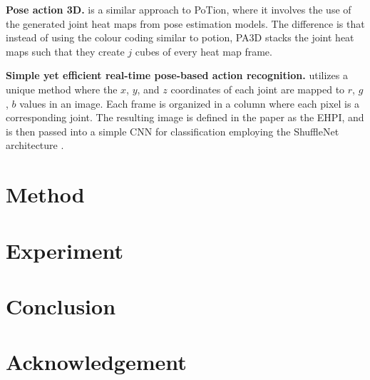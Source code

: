 \documentclass[10pt,twocolumn,letterpaper]{article}
\begin{document}
\textbf{Pose action 3D.} \cite{PA3D} is a similar approach to PoTion, where it involves the use of the generated joint heat maps from pose estimation models. The difference is that instead of using the colour coding similar to potion, PA3D stacks the joint heat maps such that they create $j$ cubes of every heat map frame.

\textbf{Simple yet efficient real-time pose-based action recognition.} \cite{simple_yet_efficient} utilizes a unique method where the $x$, $y$, and $z$ coordinates of each joint are mapped to $r$, $g$, $b$ values in an image. Each frame is organized in a column where each pixel is a corresponding joint. The resulting image is defined in the paper as the EHPI, and is then passed into a simple CNN for classification employing the ShuffleNet architecture \cite{shuffle}.


\section{Method}
\label{sec:method}

\section{Experiment}
\label{sec:experiment}

\section{Conclusion}
\label{sec:conclusion}

\section{Acknowledgement}
\label{sec:acknowledgement}

{\small


}
\end{document}
